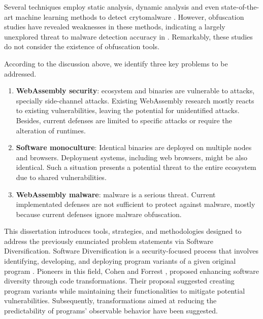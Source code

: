 Several techniques employ static analysis, dynamic analysis and even state-of-the-art machine learning methods to detect \Wasm crytomalware \cite{Minesweeper,MinerRay,MINOS,SEISMIC,RAPID,Outguard}.
However, obfuscation studies have revealed weaknesses in these methods, indicating a largely unexplored threat to malware detection accuracy in \Wasm.
Remarkably, these studies do not consider the existence of obfuscation tools.









According to the discussion above, we identify three key problems to be addressed.

\begin{enumerate}[label=\textbf{Ps\arabic*}, ref=C\arabic*]

	\item \label{prob4} \textbf{WebAssembly security}: \Wasm ecosystem and binaries are vulnerable to attacks, specially side-channel attacks. Existing WebAssembly research mostly reacts to existing vulnerabilities, leaving the potential for unidentified attacks.
	Besides, current defenses are limited to specific attacks or require the alteration of runtimes. 
	
	\item \label{prob2} \textbf{Software monoculture}: 
	Identical \Wasm binaries are deployed on multiple nodes and browsers. 
	Deployment systems, including web browsers, might be also identical. 
	Such a situation presents a potential threat to the entire ecosystem due to shared vulnerabilities.
	 
	\item \label{prob5} \textbf{WebAssembly malware}: \Wasm malware is a serious threat. Current implementated defenses are not sufficient to protect against \Wasm malware, mostly because current defenses ignore malware obfuscation.

\end{enumerate}


\begin{comment}
\msection{Problem statement}

\end{comment}


This dissertation introduces tools, strategies, and methodologies designed to address the previously enunciated problem statements via Software Diversification.
Software Diversification is a security-focused process that involves identifying, developing, and deploying program variants of a given original program \cite{okhravi2013survey}.
Pioneers in this field, Cohen \etal \cite{cohen1993operating} and Forrest \etal \cite{595185}, proposed enhancing software diversity through code transformations. 
Their proposal suggested creating program variants while maintaining their functionalities to mitigate potential vulnerabilities.
Subsequently, transformations aimed at reducing the predictability of programs' observable behavior have been suggested. 


